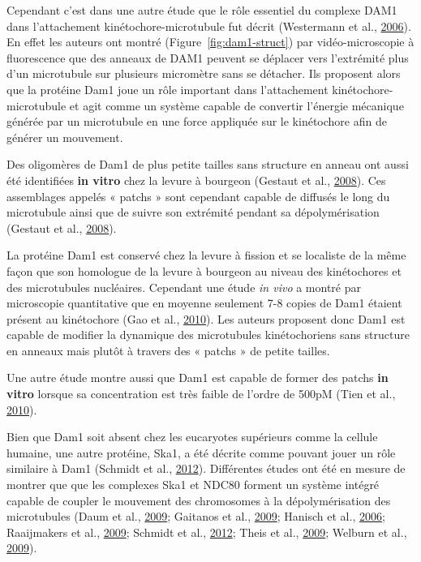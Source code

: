 \documentclass[12pt,a4paper,twoside,openright]{book}
\begin{document}
Cependant c'est dans une autre étude que le rôle essentiel du complexe
DAM1 dans l'attachement kinétochore-microtubule fut décrit (Westermann
et al., \hyperref[ref-Westermann2006]{2006}). En effet les auteurs ont
montré (Figure~\ref{fig:dam1-struct}) par vidéo-microscopie à
fluorescence que des anneaux de DAM1 peuvent se déplacer vers
l'extrémité plus d'un microtubule sur plusieurs micromètre sans se
détacher. Ils proposent alors que la protéine Dam1 joue un rôle
important dans l'attachement kinétochore-microtubule et agit comme un
système capable de convertir l'énergie mécanique générée par un
microtubule en une force appliquée sur le kinétochore afin de générer un
mouvement.

Des oligomères de Dam1 de plus petite tailles sans structure en anneau
ont aussi été identifiées \textbf{in vitro} chez la levure à bourgeon
(Gestaut et al., \hyperref[ref-Gestaut2008]{2008}). Ces assemblages
appelés « patchs » sont cependant capable de diffusés le long du
microtubule ainsi que de suivre son extrémité pendant sa
dépolymérisation (Gestaut et al., \hyperref[ref-Gestaut2008]{2008}).

La protéine Dam1 est conservé chez la levure à fission et se localiste
de la même façon que son homologue de la levure à bourgeon au niveau des
kinétochores et des microtubules nucléaires. Cependant une étude
\emph{in vivo} a montré par microscopie quantitative que en moyenne
seulement 7-8 copies de Dam1 étaient présent au kinétochore (Gao et al.,
\hyperref[ref-Gao2010]{2010}). Les auteurs proposent donc Dam1 est
capable de modifier la dynamique des microtubules kinétochoriens sans
structure en anneaux mais plutôt à travers des « patchs » de petite
tailles.

Une autre étude montre aussi que Dam1 est capable de former des patchs
\textbf{in vitro} lorsque sa concentration est très faible de l'ordre de
500pM (Tien et al., \hyperref[ref-Tien2010]{2010}).

Bien que Dam1 soit absent chez les eucaryotes supérieurs comme la
cellule humaine, une autre protéine, Ska1, a été décrite comme pouvant
jouer un rôle similaire à Dam1 (Schmidt et al.,
\hyperref[ref-Schmidt2012]{2012}). Différentes études ont été en mesure
de montrer que que les complexes Ska1 et NDC80 forment un système
intégré capable de coupler le mouvement des chromosomes à la
dépolymérisation des microtubules (Daum et al.,
\hyperref[ref-Daum2009]{2009}; Gaitanos et al.,
\hyperref[ref-Gaitanos2009]{2009}; Hanisch et al.,
\hyperref[ref-Hanisch2006]{2006}; Raaijmakers et al.,
\hyperref[ref-Raaijmakers2009]{2009}; Schmidt et al.,
\hyperref[ref-Schmidt2012]{2012}; Theis et al.,
\hyperref[ref-Theis2009]{2009}; Welburn et al.,
\hyperref[ref-Welburn2009]{2009}).
\end{document}
